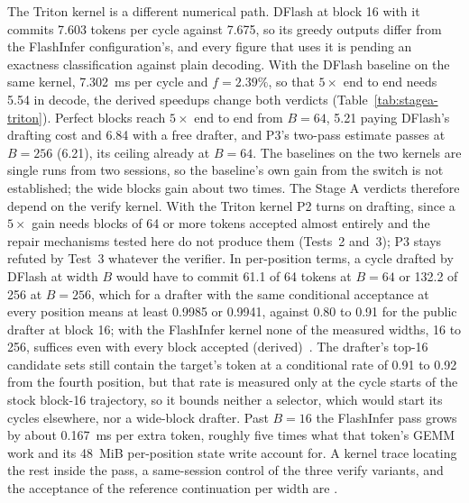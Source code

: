 The Triton kernel is a different numerical path. DFlash at block 16 with it commits 7.603 tokens per cycle against 7.675, so its greedy outputs differ from the FlashInfer configuration's, and every figure that uses it is pending an exactness classification against plain decoding. With the DFlash baseline on the same kernel, 7.302~ms per cycle and $f=2.39\%$, so that $5\times$ end to end needs 5.54 in decode, the derived speedups change both verdicts (Table~\ref{tab:stagea-triton}). Perfect blocks reach $5\times$ end to end from $B=64$, 5.21 paying DFlash's drafting cost and 6.84 with a free drafter, and P3's two-pass estimate passes at $B=256$ (6.21), its ceiling already at $B=64$. The baselines on the two kernels are single runs from two sessions, so the baseline's own gain from the switch is not established; the wide blocks gain about two times. The Stage A verdicts therefore depend on the verify kernel. With the Triton kernel P2 turns on drafting, since a $5\times$ gain needs blocks of 64 or more tokens accepted almost entirely and the repair mechanisms tested here do not produce them (Tests~2 and~3); P3 stays refuted by Test~3 whatever the verifier. In per-position terms, a cycle drafted by DFlash at width $B$ would have to commit 61.1 of 64 tokens at $B=64$ or 132.2 of 256 at $B=256$, which for a drafter with the same conditional acceptance at every position means at least 0.9985 or 0.9941, against 0.80 to 0.91 for the public drafter at block 16; with the FlashInfer kernel none of the measured widths, 16 to 256, suffices even with every block accepted (derived)~. The drafter's top-16 candidate sets still contain the target's token at a conditional rate of 0.91 to 0.92 from the fourth position, but that rate is measured only at the cycle starts of the stock block-16 trajectory, so it bounds neither a selector, which would start its cycles elsewhere, nor a wide-block drafter. Past $B=16$ the FlashInfer pass grows by about 0.167~ms per extra token, roughly five times what that token's GEMM work and its 48~MiB per-position state write account for. A kernel trace locating the rest inside the pass, a same-session control of the three verify variants, and the acceptance of the reference continuation per width are .

